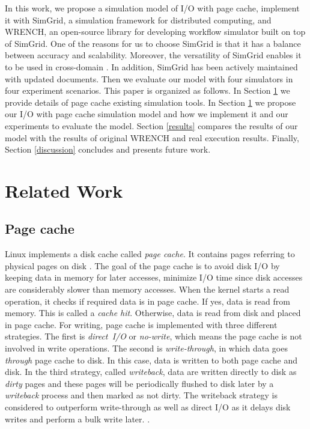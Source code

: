 \documentclass[conference]{IEEEtran}
\begin{document}
        In this work, we propose a simulation model of I/O with page cache, 
        implement it with SimGrid, a simulation framework for distributed computing, 
        and WRENCH, an open-source library for developing workflow simulator 
        built on top of SimGrid. 
        One of the reasons for us to choose SimGrid is that it has a balance 
        between accuracy and scalability. Moreover, the versatility of SimGrid 
        enables it to be used in cross-domain \cite{casanova2014simgrid}. 
        In addition, SimGrid has been actively maintained with updated documents. 
        Then we evaluate our model with four simulators in four experiment scenarios. 
        This paper is organized as follows. 
        In Section \ref{relatedwork} we provide details of page cache 
        existing simulation tools.
        In Section \ref{relatedwork} we propose our I/O with page 
        cache simulation model and how we implement it and our experiments 
        to evaluate the model.  
        Section \ref{results} compares the results of our model with the results 
        of original WRENCH and real execution results. 
        Finally, Section \ref{discussion} concludes and presents future 
        work.  
        
    \section{Related Work}        
    \label{relatedwork}    
        
        \subsection{Page cache}                            
            
            Linux implements a disk cache called \textit{page cache}. 
            It contains pages referring to physical pages on disk \cite{linuxdev3rd2010}.
            The goal of the page cache is to avoid disk I/O by keeping data in memory 
            for later accesses, minimize I/O time since disk accesses are considerably 
            slower than memory accesses.
            When the kernel starts a read operation, it checks if required data is in page cache.
            If yes, data is read from memory. This is called a \textit{cache hit}. 
            Otherwise, data is read from disk and placed in page cache.
            For writing, page cache is implemented with three different strategies. 
            The first is \textit{direct~I/O} or \textit{no-write}, which means the page cache 
            is not involved in write operations. 
            The second is \textit{write-through}, in which data goes \textit{through} 
            page cache to disk. In this case, data is written to both page cache and disk. 
            In the third strategy, called \textit{writeback}, data are written directly 
            to disk as \textit{dirty} pages and these pages will be periodically flushed 
            to disk later by a \textit{writeback} process and then marked as not dirty. 
            The writeback strategy is considered to outperform write-through as well as 
            direct I/O as it delays disk writes and perform a bulk write later.
            \cite{linuxdev3rd2010}. 
            
\end{document}
